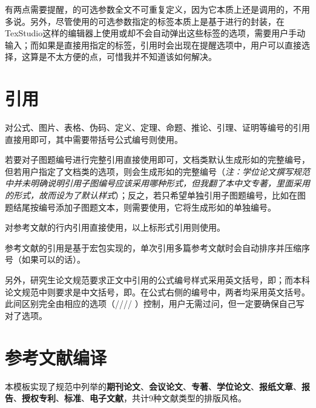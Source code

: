 \documentclass[print, doctor, vlined]{DissertUESTC}
\begin{document}
	
	有两点需要提醒，的可选参数全文不可重复定义，因为它本质上还是调用的，不用多说。另外，尽管使用的可选参数指定的标签本质上是基于进行的封装，在TexStudio这样的编辑器上使用或却不会自动弹出这些标签的选项，需要用户手动输入；而如果是直接用指定的标签，引用时会出现在提醒选项中，用户可以直接选择，这算是不太方便的点，可惜我并不知道该如何解决。
	
	
	
	\section{引用}
	
	对公式、图片、表格、伪码、定义、定理、命题、推论、引理、证明等编号的引用直接用即可，其中需要带括号公式编号则使用。
	
	若要对子图题编号进行完整引用直接使用即可，文档类默认生成形如的完整编号，但若用户指定了文档类的选项，则会生成形如的完整编号（\textit{注：学位论文撰写规范中并未明确说明引用子图编号应该采用哪种形式，但我翻了本中文专著，里面采用的形式，故而设为了默认样式}）；反之，若只希望单独引用子图题编号，比如在图题结尾按编号添加子图题文本，则需要使用，它将生成形如的单独编号。
	
	对参考文献的行内引用直接使用，以上标形式引用则使用。
	
	参考文献的引用是基于宏包实现的，单次引用多篇参考文献时会自动排序并压缩序号（如果可以的话）。

	另外，研究生论文规范要求正文中引用的公式编号样式采用英文括号，即；而本科论文规范中则要求是中文括号，即。在公式右侧的编号中，两者均采用英文括号。此间区别完全由相应的选项（//// ）控制，用户无需过问，但一定要确保自己写对了选项。
	
	
	\section{参考文献编译}
	
	本模板实现了规范中列举的\textbf{期刊论文}、\textbf{会议论文}、\textbf{专著}、\textbf{学位论文}、\textbf{报纸文章}、\textbf{报告}、\textbf{授权专利}、\textbf{标准}、\textbf{电子文献}，共计9种文献类型的排版风格。
	
\end{document}
